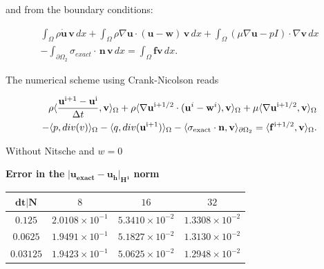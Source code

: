 \documentclass[11pt,a4paper,titlepage]{report}
\begin{document}
and from the boundary conditions: 

\begin{equation}
\begin{split}
\int_{\Omega} \rho \dot{\mathbf{u}} \, \mathbf{v} \, dx
+ \int_{\Omega} \rho  \nabla \mathbf{u} \cdot (\mathbf{u - w}) \, \mathbf{v} \, dx
+ \int_{\Omega} (\mu \nabla \mathbf{u} - pI) \cdot \nabla \mathbf{v} \, dx \\
- \int_{\partial \Omega_2} \sigma_{exact} \cdot \, \mathbf{n} \, \mathbf{v} \, dx
=  \int_{\Omega} \mathbf{f} \mathbf{v} \, dx.
\end{split}
\end{equation}

The numerical scheme using Crank-Nicolson reads

\begin{equation}
\begin{split}
\rho \langle \frac{\mathbf{u}^{\rm i+1} - \mathbf{u}^{\rm i}}{\Delta t}, \mathbf{v} \rangle_\Omega
+ \rho \langle \nabla \mathbf{u}^{\rm i+ 1/2} \cdot (\mathbf{u}^i - \mathbf{w}^i), \mathbf{v} \rangle_\Omega
+ \mu \langle \nabla \mathbf{u}^{\rm i + 1/2} , \mathbf{v} \rangle_\Omega \\
- \langle p, div(v) \rangle_\Omega 
- \langle q, div(\mathbf{u}^{\rm i+1}) \rangle_\Omega
- \langle \sigma_{\rm exact} \cdot \mathbf{n}, \mathbf{v} \rangle_{\partial \Omega_2} = \langle \mathbf{f}^{\rm i+1/2}, \mathbf{v} \rangle_\Omega.
\end{split}
\end{equation}

% 
Without Nitsche and $w=0$
\begin{center}
\textbf{Error in the } $ \mathbf{ | u_{exact} - u_h |_{H^1}}$ \textbf{norm}
\begin{tabular}{| c | c | c | c |}
\hline
$\mathbf{dt | N}$ & $8$ & $16$ & $32$ \\
\hline
$ 0.125 $ & $2.0108 \times 10^{-1}$ & $5.3410 \times 10^{-2}$ &  $ 1.3308 \times 10^{-2}$ \\
\hline
$ 0.0625$ & $1.9491  \times 10^{-1}$ & $5.1827 \times 10^{-2}$ &  $ 1.3130  \times 10^{-2}$ \\
\hline
$ 0.03125 $ & $ 1.9423 \times 10^{-1}$ & $5.0625 \times 10^{-2}$ & $ 1.2948 \times 10^{-2}$ \\
\hline
\end{tabular}
\end{center}
\end{document}
